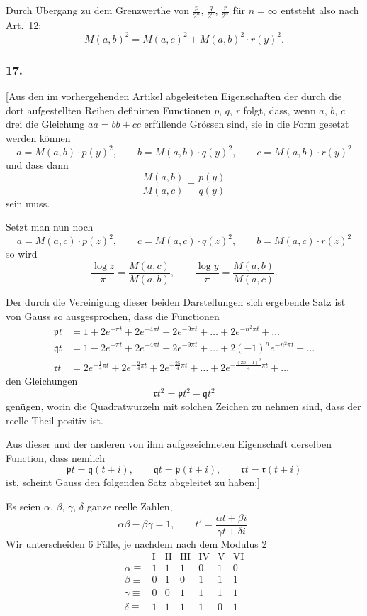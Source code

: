 \documentclass[12pt,a4paper]{article}
\begin{document}
Durch \"Ubergang zu dem Grenzwerthe von $\frac{p}{2^n}$, $\frac{q}{2^n}$, $\frac{r}{2^n}$ f\"ur $n=\infty$ entsteht also nach Art.\ 12:
\[
M(a,b)^2 = M(a,c)^2 + M(a,b)^2 \cdot r(y)^2.
\]

\subsubsection*{17.}

[Aus den im vorhergehenden Artikel abgeleiteten Eigenschaften der durch die dort aufgestellten Reihen definirten Functionen $p$, $q$, $r$ folgt, dass, wenn $a$, $b$, $c$ drei die Gleichung $aa = bb + cc$ erf\"ullende Gr\"ossen sind, sie in die Form gesetzt werden k\"onnen
\[
a = M(a,b)\cdot p(y)^2, \qquad b = M(a,b)\cdot q(y)^2, \qquad c = M(a,b)\cdot r(y)^2
\]
und dass dann
\[
\frac{M(a,b)}{M(a,c)} = \frac{p(y)}{q(y)}
\]
sein muss.

Setzt man nun noch
\[
a = M(a,c)\cdot p(z)^2, \qquad c = M(a,c)\cdot q(z)^2, \qquad b = M(a,c)\cdot r(z)^2
\]
so wird
\[
\frac{\log z}{\pi} = \frac{M(a,c)}{M(a,b)}, \qquad \frac{\log y}{\pi} = \frac{M(a,b)}{M(a,c)}.
\]

Der durch die Vereinigung dieser beiden Darstellungen sich ergebende Satz ist von Gauss so ausgesprochen, dass die Functionen
\[
\begin{aligned}
\mathfrak{p}t &= 1 + 2e^{-\pi t} + 2e^{-4\pi t} + 2e^{-9\pi t} + \dots + 2e^{-n^2\pi t} + \dots \\
\mathfrak{q}t &= 1 - 2e^{-\pi t} + 2e^{-4\pi t} - 2e^{-9\pi t} + \dots + 2(-1)^n e^{-n^2\pi t} + \dots \\
\mathfrak{r}t &= 2e^{-\frac{1}{4}\pi t} + 2e^{-\frac{9}{4}\pi t} + 2e^{-\frac{25}{4}\pi t} + \dots + 2e^{-\frac{(2n+1)^2}{4}\pi t} + \dots
\end{aligned}
\]
den Gleichungen
\[
\mathfrak{r}t^2 = \mathfrak{p}t^2 - \mathfrak{q}t^2
\]
gen\"ugen, worin die Quadratwurzeln mit solchen Zeichen zu nehmen sind, dass der reelle Theil positiv ist.

Aus dieser und der anderen von ihm aufgezeichneten Eigenschaft derselben Function, dass nemlich
\[
\mathfrak{p}t = \mathfrak{q}(t+i), \qquad \mathfrak{q}t = \mathfrak{p}(t+i), \qquad \mathfrak{r}t = \mathfrak{r}(t+i)
\]
ist, scheint Gauss den folgenden Satz abgeleitet zu haben:]

Es seien $\alpha$, $\beta$, $\gamma$, $\delta$ ganze reelle Zahlen,
\[
\alpha\beta - \beta\gamma = 1, \qquad t' = \frac{\alpha t + \beta i}{\gamma t + \delta i}.
\]
Wir unterscheiden 6 F\"alle, je nachdem nach dem Modulus 2
\[
\begin{array}{c|cccccc}
& \text{I} & \text{II} & \text{III} & \text{IV} & \text{V} & \text{VI} \\ \hline
\alpha \equiv & 1 & 1 & 1 & 0 & 1 & 0 \\
\beta \equiv & 0 & 1 & 0 & 1 & 1 & 1 \\
\gamma \equiv & 0 & 0 & 1 & 1 & 1 & 1 \\
\delta \equiv & 1 & 1 & 1 & 1 & 0 & 1
\end{array}
\]
\end{document}
